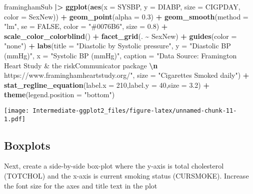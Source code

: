 \documentclass[
]{article}
\newenvironment{Shaded}{\begin{snugshade}}{\end{snugshade}}
\newcommand{\AttributeTok}[1]{\textcolor[rgb]{0.13,0.29,0.53}{#1}}
\newcommand{\ConstantTok}[1]{\textcolor[rgb]{0.56,0.35,0.01}{#1}}
\newcommand{\DecValTok}[1]{\textcolor[rgb]{0.00,0.00,0.81}{#1}}
\newcommand{\FloatTok}[1]{\textcolor[rgb]{0.00,0.00,0.81}{#1}}
\newcommand{\FunctionTok}[1]{\textcolor[rgb]{0.13,0.29,0.53}{\textbf{#1}}}
\newcommand{\NormalTok}[1]{#1}
\newcommand{\SpecialCharTok}[1]{\textcolor[rgb]{0.81,0.36,0.00}{\textbf{#1}}}
\newcommand{\StringTok}[1]{\textcolor[rgb]{0.31,0.60,0.02}{#1}}
\begin{document}
\begin{Shaded}
\begin{Highlighting}[]
\NormalTok{framinghamSub }\SpecialCharTok{|\textgreater{}}
  \FunctionTok{ggplot}\NormalTok{(}\FunctionTok{aes}\NormalTok{(}\AttributeTok{x =}\NormalTok{ SYSBP, }\AttributeTok{y =}\NormalTok{ DIABP,}
             \AttributeTok{size =}\NormalTok{ CIGPDAY,}
             \AttributeTok{color =}\NormalTok{ SexNew)) }\SpecialCharTok{+}
  \FunctionTok{geom\_point}\NormalTok{(}\AttributeTok{alpha =} \FloatTok{0.3}\NormalTok{) }\SpecialCharTok{+}
  \FunctionTok{geom\_smooth}\NormalTok{(}\AttributeTok{method =} \StringTok{"lm"}\NormalTok{, }\AttributeTok{se =} \ConstantTok{FALSE}\NormalTok{,}
              \AttributeTok{color =} \StringTok{"\#0076B6"}\NormalTok{, }\AttributeTok{size =} \FloatTok{0.8}\NormalTok{) }\SpecialCharTok{+}
  \FunctionTok{scale\_color\_colorblind}\NormalTok{() }\SpecialCharTok{+}
  \FunctionTok{facet\_grid}\NormalTok{(. }\SpecialCharTok{\textasciitilde{}}\NormalTok{ SexNew) }\SpecialCharTok{+}
  \FunctionTok{guides}\NormalTok{(}\AttributeTok{color =} \StringTok{"none"}\NormalTok{) }\SpecialCharTok{+}
  \FunctionTok{labs}\NormalTok{(}\AttributeTok{title =} \StringTok{"Diastolic by Systolic pressure"}\NormalTok{,}
       \AttributeTok{y =} \StringTok{"Diastolic BP (mmHg)"}\NormalTok{,}
       \AttributeTok{x =} \StringTok{"Systolic BP (mmHg)"}\NormalTok{,}
       \AttributeTok{caption =} \StringTok{"Data Source: Framington Heart Study \& the riskCommunicator package }\SpecialCharTok{\textbackslash{}n}\StringTok{ https://www.framinghamheartstudy.org/"}\NormalTok{,}
       \AttributeTok{size =} \StringTok{"Cigarettes Smoked daily"}\NormalTok{) }\SpecialCharTok{+}
  \FunctionTok{stat\_regline\_equation}\NormalTok{(}\AttributeTok{label.x =} \DecValTok{210}\NormalTok{,}\AttributeTok{label.y =} \DecValTok{40}\NormalTok{,}\AttributeTok{size =} \FloatTok{3.2}\NormalTok{) }\SpecialCharTok{+}
  \FunctionTok{theme}\NormalTok{(}\AttributeTok{legend.position =} \StringTok{"bottom"}\NormalTok{)}
\end{Highlighting}
\end{Shaded}

\texttt{[image: Intermediate-ggplot2\_files/figure-latex/unnamed-chunk-11-1.pdf]}

\hypertarget{boxplots}{%
\subsection{Boxplots}\label{boxplots}}

Next, create a side-by-side box-plot where the y-axis is total
cholesterol (TOTCHOL) and the x-axis is current smoking status
(CURSMOKE). Increase the font size for the axes and title text in the
plot
\end{document}
